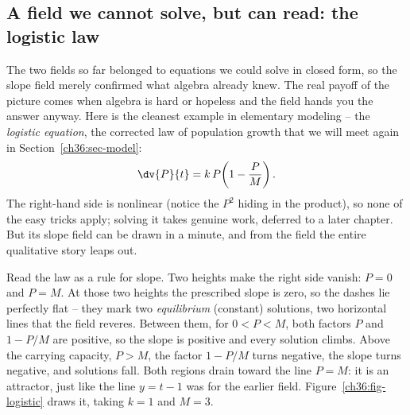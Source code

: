 \subsection{A field we cannot solve, but can read: the logistic law}
\label{ch36:sub-logistic-field}

The two fields so far belonged to equations we could solve in closed form, so the slope field merely confirmed what algebra already knew. The real payoff of the picture comes when algebra is hard or hopeless and the field hands you the answer anyway. Here is the cleanest example in elementary modeling -- the \emph{logistic equation}, the corrected law of population growth that we will meet again in Section~\ref{ch36:sec-model}:
\[
  \dv{P}{t} = k\,P\!\left(1 - \frac{P}{M}\right).
\]
The right-hand side is nonlinear (notice the $P^2$ hiding in the product), so none of the easy tricks apply; solving it takes genuine work, deferred to a later chapter. But its slope field can be drawn in a minute, and from the field the entire qualitative story leaps out.

Read the law as a rule for slope. Two heights make the right side vanish: $P=0$ and $P=M$. At those two heights the prescribed slope is zero, so the dashes lie perfectly flat -- they mark two \emph{equilibrium} (constant) solutions, two horizontal lines that the field reveres. Between them, for $0 < P < M$, both factors $P$ and $1-P/M$ are positive, so the slope is positive and every solution climbs. Above the carrying capacity, $P > M$, the factor $1-P/M$ turns negative, the slope turns negative, and solutions fall. Both regions drain toward the line $P=M$: it is an attractor, just like the line $y=t-1$ was for the earlier field. Figure~\ref{ch36:fig-logistic} draws it, taking $k=1$ and $M=3$.


